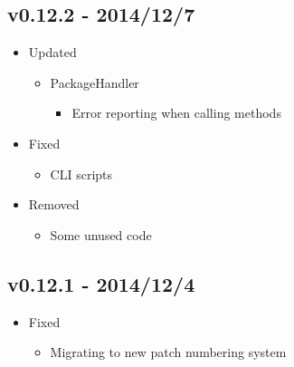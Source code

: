 \documentclass[letterpaper,10pt,english]{sphinxmanual}
\begin{document}
\subsection{v0.12.2 - 2014/12/7}
\label{release_history:v0-12-2-2014-12-7}\begin{itemize}
\item {} 
Updated
\begin{itemize}
\item {} 
PackageHandler
\begin{itemize}
\item {} 
Error reporting when calling methods

\end{itemize}

\end{itemize}

\item {} 
Fixed
\begin{itemize}
\item {} 
CLI scripts

\end{itemize}

\item {} 
Removed
\begin{itemize}
\item {} 
Some unused code

\end{itemize}

\end{itemize}


\subsection{v0.12.1 - 2014/12/4}
\label{release_history:v0-12-1-2014-12-4}\begin{itemize}
\item {} 
Fixed
\begin{itemize}
\item {} 
Migrating to new patch numbering system

\end{itemize}

\end{itemize}
\end{document}

